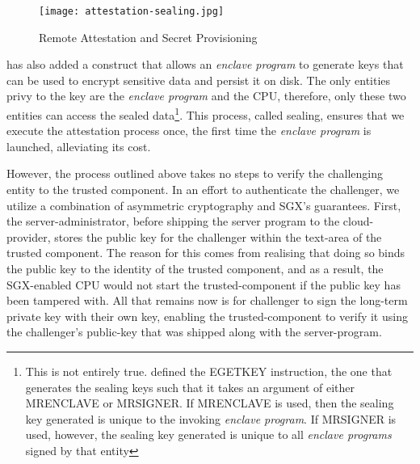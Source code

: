 \documentclass[../main.tex]{subfiles}
\begin{document}
\begin{figure}[H]
  \centering
  \texttt{[image: attestation-sealing.jpg]}
  \caption{Remote Attestation and Secret Provisioning}
  \label{fig:attest}
\end{figure}

\Intel has also added a construct that allows an \textit{enclave
program} to generate keys that can be used to encrypt sensitive data
and persist it on disk. The only entities privy to the key are the
\textit{enclave program} and the CPU, therefore, only these two
entities can access the sealed data\footnote{This is not entirely
true. \Intel defined the EGETKEY instruction, the one that generates
the sealing keys such that it takes an argument of either MRENCLAVE or
MRSIGNER. If MRENCLAVE is used, then the sealing key generated is
unique to the invoking \textit{enclave program}. If MRSIGNER is used,
however, the sealing key generated is unique to all \textit{enclave
programs} signed by that entity}. This process, called sealing,
ensures that we execute the attestation process once, the first time
the \textit{enclave program} is launched, alleviating its cost.

However, the process outlined above takes no steps to verify the
challenging entity to the trusted component. In an effort to
authenticate the challenger, we utilize a combination of asymmetric
cryptography and SGX's guarantees.
First, the server-administrator, before shipping the server program to
the cloud-provider, stores the public key for the challenger within
the text-area of the trusted component. The reason for this comes from
realising that doing so binds the public key to the identity of the
trusted component, and as a result, the SGX-enabled CPU would not
start the trusted-component if the public key has been tampered
with. All that remains now is for challenger to sign the long-term
private key with their own key, enabling the trusted-component to
verify it using the challenger's public-key that was shipped along
with the server-program.
\end{document}
